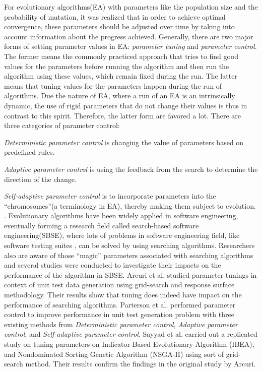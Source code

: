For evolutionary algorithms(EA) with parameters like the population size and the probability of mutation, it was realized that in order to achieve optimal convergence, these parameters should be adjusted over time by taking into account information about the progress achieved. Generally, there are two major forms of setting parameter values in EA: {\it parameter tuning} and {\it parameter control}\cite{brest2006self}. The former means the commonly practiced approach that tries to find good values for the parameters before running the algorithm and then run the algorithm using these values, which remain fixed during the run. The latter means that tuning values for the parameters happen during the run of algorithms. Due the nature of EA, where a run of an EA is an intrinsically dynamic, the use of rigid parameters that do not change their values is thus in contrast to this spirit\cite{eiben1999parameter}. Therefore,  the latter form are favored a lot. There are three categories of parameter control\cite{eiben1999parameter}:
\bi
\item {\it Deterministic parameter control} is changing the value of parameters based on predefined rules\cite{Fogarty1989}.
\item {\it Adaptive parameter control} is using the feedback from the search to determine the direction of the change\cite{schraudolph1992dynamic,shaefer1987argot}.
\item {\it Self-adaptive parameter control} is to incorporate parameters into the ``chromosomes''(a terminology in EA), thereby making them subject to evolution\cite{brest2006self,qin2005self,omran2005self,yang2008self}.
\ei.
Evolutionary algorithms have been widely applied in software engineering, eventually forming a research field called search-based software engineering(SBSE)\cite{harman2009search}, where lots of problems in software
engineering field, like software
testing suites \cite{ali2010systematic}, can be solved
by using searching algorithms. Researchers also are aware of those ``magic'' parameters associated with searching algorithms and several studies were conducted to investigate their impacts on the performance of the algorithm in SBSE. Arcuri et al. \cite{arcuri2013parameter} studied parameter tunings in context of unit test data 
generation using grid-search and response surface methodology.
Their results show that tuning does indeed have impact on the performance of searching algorithms. Parterson et al.\cite{paterson2015parameter} performed parameter control to improve performance in unit
test generation problem with three existing methods from {\it Deterministic parameter control}, {\it Adaptive parameter control}, and {\it Self-adaptive parameter control}. Sayyad et al. \cite{sayyad2013parameter} carried out a replicated study on tuning
parameters on Indicator-Based Evolutionary Algorithm (IBEA), and Nondominated Sorting Genetic Algorithm (NSGA-II) using sort of grid-search method. Their results confirm the findings in the original study by Arcuri.

